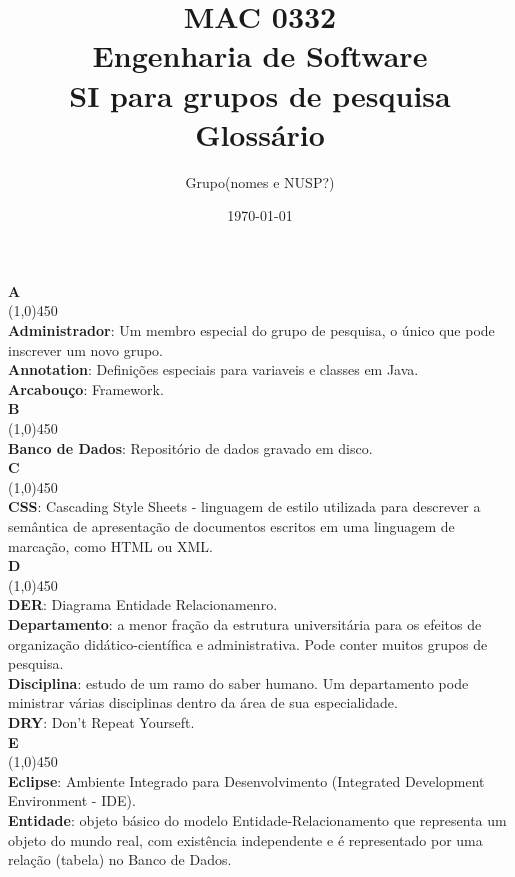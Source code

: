 \documentclass[11pt, a4paper]{article}
\title{MAC 0332\\
	Engenharia de Software\\
	SI para grupos de pesquisa\\
	Glossário}
\date{\today}
\author{Grupo(nomes e NUSP?)}
\begin{document}
	\maketitle
	\newpage

	\noindent\textbf{\huge{A}}\\
	\line(1,0){450}\\
	\textbf{Administrador}: Um membro especial do grupo de pesquisa, o único 
	que pode inscrever um novo grupo.\\
	\textbf{Annotation}: Definições especiais para variaveis e 
	classes em Java.\\
	\textbf{Arcabouço}: Framework.\\
	
	\noindent\textbf{\huge{B}}\\
	\line(1,0){450}\\
	\textbf{Banco de Dados}: Repositório de dados gravado em disco.\\

	\noindent\textbf{\huge{C}}\\
	\line(1,0){450}\\
	\textbf{CSS}: Cascading Style Sheets - linguagem de estilo utilizada para descrever a semântica de apresentação de documentos escritos em uma linguagem de marcação, como HTML ou XML.\\

	\noindent\textbf{\huge{D}}\\
	\line(1,0){450}\\
	\textbf{DER}: Diagrama Entidade Relacionamenro.\\
	\textbf{Departamento}: a menor fração da estrutura universitária para os efeitos de organização didático-científica e administrativa. Pode conter muitos grupos de pesquisa.\\
	\textbf{Disciplina}: estudo de um ramo do saber humano. Um departamento pode ministrar várias disciplinas dentro da área de sua especialidade.\\
	\textbf{DRY}: Don't Repeat Yourseft.\\
	
	\noindent\textbf{\huge{E}}\\
	\line(1,0){450}\\
	\textbf{Eclipse}: Ambiente Integrado para Desenvolvimento (Integrated Development Environment - IDE).\\
	\textbf{Entidade}: objeto básico do modelo Entidade-Relacionamento que representa um objeto do mundo real, com existência independente e é representado por uma relação (tabela) no Banco de Dados.\\
	
\end{document}
